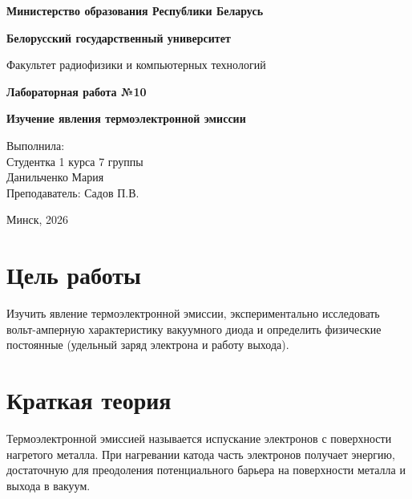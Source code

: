 \documentclass[a4paper,14pt]{extarticle}
\begin{document}
\begin{titlepage}
\begin{center}

\textbf{Министерство образования Республики Беларусь}

\textbf{Белорусский государственный университет}

Факультет радиофизики и компьютерных технологий

\vspace{6cm}

\textbf{Лабораторная работа №10}

\textbf{Изучение явления термоэлектронной эмиссии}

\end{center}

\vfill

\begin{flushright}
Выполнила:\\
Студентка 1 курса 7 группы\\
Данильченко Мария\\
Преподаватель: Садов П.В.\\

\end{flushright}

\vfill

\begin{center}
Минск, 2026
\end{center}

\end{titlepage}


\section*{Цель работы}

Изучить явление термоэлектронной эмиссии, экспериментально
исследовать вольт-амперную характеристику вакуумного диода и определить физические постоянные (удельный заряд электрона и работу выхода).


\section*{Краткая теория}

Термоэлектронной эмиссией называется испускание электронов
с поверхности нагретого металла. При нагревании катода часть электронов получает энергию,
достаточную для преодоления потенциального барьера на поверхности
металла и выхода в вакуум.
\end{document}

